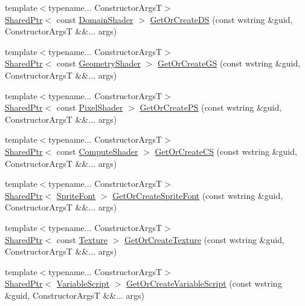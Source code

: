 \begin{DoxyCompactItemize}
\item 
{\footnotesize template$<$typename... Constructor\+ArgsT$>$ }\\\hyperlink{namespacemage_a1e01ae66713838a7a67d30e44c67703e}{Shared\+Ptr}$<$ const \hyperlink{namespacemage_ad5d9bb50a2b73d471275badcd9b2f155}{Domain\+Shader} $>$ \hyperlink{classmage_1_1_resource_manager_a77fd5f64a5191df468ccfaabd197d60b}{Get\+Or\+Create\+DS} (const wstring \&guid, Constructor\+ArgsT \&\&... args)
\item 
{\footnotesize template$<$typename... Constructor\+ArgsT$>$ }\\\hyperlink{namespacemage_a1e01ae66713838a7a67d30e44c67703e}{Shared\+Ptr}$<$ const \hyperlink{namespacemage_abb3c4ec904feaa4f076ab736f6bab40f}{Geometry\+Shader} $>$ \hyperlink{classmage_1_1_resource_manager_a2d0c96862f5658379bc1bce9b77d9003}{Get\+Or\+Create\+GS} (const wstring \&guid, Constructor\+ArgsT \&\&... args)
\item 
{\footnotesize template$<$typename... Constructor\+ArgsT$>$ }\\\hyperlink{namespacemage_a1e01ae66713838a7a67d30e44c67703e}{Shared\+Ptr}$<$ const \hyperlink{namespacemage_ac98506b7edd999ea43ec46fbd0330238}{Pixel\+Shader} $>$ \hyperlink{classmage_1_1_resource_manager_a567c4e158de9a664d76c464c12aed7d2}{Get\+Or\+Create\+PS} (const wstring \&guid, Constructor\+ArgsT \&\&... args)
\item 
{\footnotesize template$<$typename... Constructor\+ArgsT$>$ }\\\hyperlink{namespacemage_a1e01ae66713838a7a67d30e44c67703e}{Shared\+Ptr}$<$ const \hyperlink{namespacemage_af219172e81f21ea8002b17b1efbb25e0}{Compute\+Shader} $>$ \hyperlink{classmage_1_1_resource_manager_aa23f61f37b9d2fcc3f53d8018a32a22c}{Get\+Or\+Create\+CS} (const wstring \&guid, Constructor\+ArgsT \&\&... args)
\item 
{\footnotesize template$<$typename... Constructor\+ArgsT$>$ }\\\hyperlink{namespacemage_a1e01ae66713838a7a67d30e44c67703e}{Shared\+Ptr}$<$ \hyperlink{classmage_1_1_sprite_font}{Sprite\+Font} $>$ \hyperlink{classmage_1_1_resource_manager_a4460beca6c84b100f613936d26551119}{Get\+Or\+Create\+Sprite\+Font} (const wstring \&guid, Constructor\+ArgsT \&\&... args)
\item 
{\footnotesize template$<$typename... Constructor\+ArgsT$>$ }\\\hyperlink{namespacemage_a1e01ae66713838a7a67d30e44c67703e}{Shared\+Ptr}$<$ const \hyperlink{classmage_1_1_texture}{Texture} $>$ \hyperlink{classmage_1_1_resource_manager_a752a3c3db2cf7d93c61c5f22e0bf6a3a}{Get\+Or\+Create\+Texture} (const wstring \&guid, Constructor\+ArgsT \&\&... args)
\item 
{\footnotesize template$<$typename... Constructor\+ArgsT$>$ }\\\hyperlink{namespacemage_a1e01ae66713838a7a67d30e44c67703e}{Shared\+Ptr}$<$ \hyperlink{classmage_1_1_variable_script}{Variable\+Script} $>$ \hyperlink{classmage_1_1_resource_manager_aa3d2659c473c06423447114dcc0a602c}{Get\+Or\+Create\+Variable\+Script} (const wstring \&guid, Constructor\+ArgsT \&\&... args)
\end{DoxyCompactItemize}
